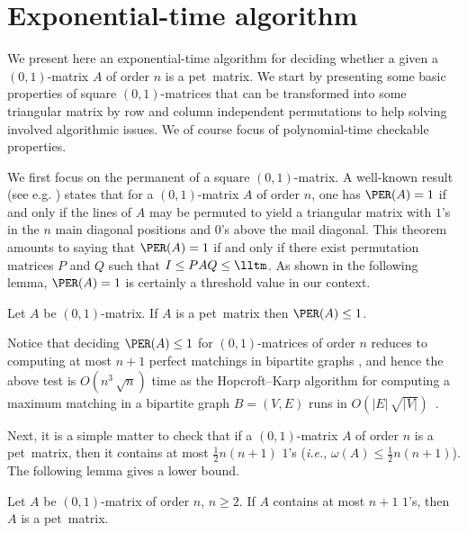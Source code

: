 \documentclass[a4paper,10pt]{llncs}
\newcommand{\PET}{pet}
\begin{document}
\section{Exponential-time algorithm}
\label{section:Exponential-time algorithm}

We present here an exponential-time algorithm for deciding whether a
given a $(0,1)$-matrix $A$ of order $n$ is a \PET\ matrix.
We start by presenting some basic properties of square $(0,1)$-matrices
that can be transformed into some triangular matrix by row and
column independent permutations to help solving involved 
algorithmic issues. We of course focus of polynomial-time checkable
properties. 

We first focus on the permanent of a square $(0,1)$-matrix.
A well-known result (see e.g. \cite{Brualdi:Ryser:1991})
states that for a $(0,1)$-matrix $A$ of order $n$,
one has $\PER(A)=1$ if and only if the lines of $A$
may be permuted to yield a triangular matrix with $1$'s
in the $n$ main diagonal positions and $0$'s above the mail diagonal.
This theorem amounts to saying that
$\PER(A)=1$ if and only if there exist permutation matrices $P$ and $Q$
such that $I \leq PAQ \leq \lltm$.
As shown in the following lemma, $\PER(A)=1$ is certainly 
a threshold value in our context.

\begin{lemma}
    \label{lemma:permanent}
Let $A$ be $(0,1)$-matrix.
If $A$ is a \PET\  matrix
then $\PER(A) \leq 1$.
\end{lemma}

Notice that deciding $\PER(A) \leq 1$ for $(0,1)$-matrices of order $n$ 
reduces to computing at most
$n+1$ perfect matchings in bipartite graphs 
\cite{Brualdi:Ryser:1991},
and hence the above test is 
$O(n^3\,\sqrt{n})$ time 
as the Hopcroft–Karp algorithm for computing a maximum matching
in a bipartite graph $B = (V,E)$ runs in 
$O(|E|\,\sqrt{|V|})$~\cite{HopcroftKarp:1975}.

Next, it is a simple matter to check that 
if a $(0,1)$-matrix $A$ of order $n$ is a \PET\ matrix, 
then it contains at most $\frac{1}{2}n(n+1)$ $1$'s 
(\emph{i.e.}, $\omega(A) \leq \frac{1}{2}n(n+1)$).
The following lemma gives a lower bound.

\begin{lemma}
    \label{lemma:just a few 1s}
Let $A$ be $(0,1)$-matrix of order $n$, $n \geq 2$.
If $A$ contains at most $n+1$ $1$'s, then $A$ is a \PET\ matrix.
\end{lemma}
\end{document}
